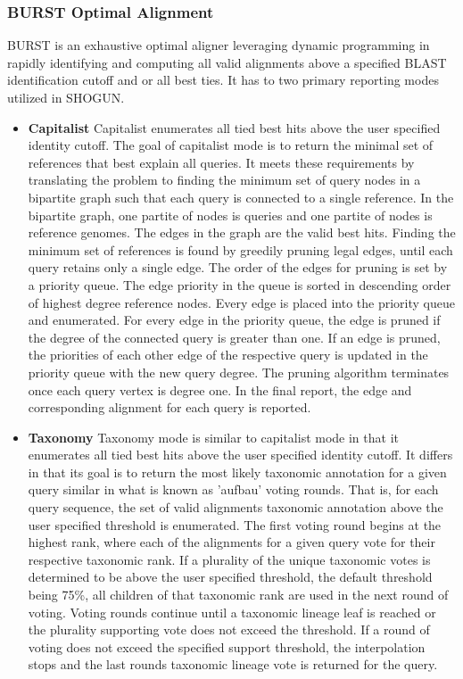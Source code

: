 \subsubsection{BURST Optimal Alignment}

BURST is an exhaustive optimal aligner leveraging dynamic programming in rapidly identifying and computing all valid alignments above a specified BLAST identification cutoff and or all best ties. It has to two primary reporting modes utilized in SHOGUN.

\begin{itemize}

 \item \textbf{Capitalist} Capitalist enumerates all tied best hits above the user specified identity cutoff. The goal of capitalist mode is to return the minimal set of references that best explain all queries. It meets these requirements by translating the problem to finding the minimum set of query nodes in a bipartite graph such that each query is connected to a single reference. In the bipartite graph, one partite of nodes is queries and one partite of nodes is reference genomes. The edges in the graph are the valid best hits. Finding the minimum set of references is found by greedily pruning legal edges, until each query retains only a single edge. The order of the edges for pruning is set by a priority queue. The edge priority in the queue is sorted in descending order of highest degree reference nodes. Every edge is placed into the priority queue and enumerated. For every edge in the priority queue, the edge is pruned if the degree of the connected query is greater than one. If an edge is pruned, the priorities of each other edge of the respective query is updated in the priority queue with the new query degree. The pruning algorithm terminates once each query vertex is degree one. In the final report, the edge and corresponding alignment for each query is reported.

\item \textbf{Taxonomy} Taxonomy mode is similar to capitalist mode in that it enumerates all tied best hits above the user specified identity cutoff. It differs in that its goal is to return the most likely taxonomic annotation for a given query similar in what is known as 'aufbau' voting rounds. That is, for each query sequence, the set of valid alignments taxonomic annotation above the user specified threshold is enumerated. The first voting round begins at the highest rank, where each of the alignments for a given query vote for their respective taxonomic rank. If a plurality of the unique taxonomic votes is determined to be above the user specified threshold, the default threshold being 75\%, all children of that taxonomic rank are used in the next round of voting. Voting rounds continue until a taxonomic lineage leaf is reached or the plurality supporting vote does not exceed the threshold. If a round of voting does not exceed the specified support threshold, the interpolation stops and the last rounds taxonomic lineage vote is returned for the query.

\end{itemize}

